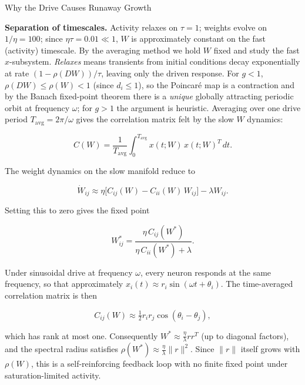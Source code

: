 \documentclass[
11pt,notheorems,hyperref={pdfauthor=whatever}
]{beamer}
\begin{document}
\begin{frame}{Why the Drive Causes Runaway Growth}
\small

\textbf{Separation of timescales.} Activity relaxes on $\tau=1$; weights evolve
on $1/\eta=100$; since $\eta\tau=0.01\ll 1$, $W$ is approximately constant on
the fast (activity) timescale. By the averaging method we hold $W$ fixed and
study the fast $x$-subsystem. \emph{Relaxes} means transients from initial
conditions decay exponentially at rate $(1-\rho(DW))/\tau$, leaving only the
driven response. For $g<1$, $\rho(DW)\leq\rho(W)<1$ (since $d_i\leq 1$), so
the Poincar\'{e} map is a contraction and by the Banach fixed-point theorem
there is a \emph{unique} globally attracting periodic orbit at frequency
$\omega$; for $g>1$ the argument is heuristic. Averaging over one drive period
$T_{\mathrm{avg}}=2\pi/\omega$ gives the correlation matrix felt by the slow
$W$ dynamics:

\[
C(W) = \frac{1}{T_{\mathrm{avg}}}\int_0^{T_{\mathrm{avg}}} x(t;W)\,x(t;W)^T \, dt.
\]

The weight dynamics on the slow manifold reduce to

\[
\dot{W}_{ij} \approx
\eta\bigl[C_{ij}(W) - C_{ii}(W)\, W_{ij}\bigr] - \lambda W_{ij}.
\]

Setting this to zero gives the fixed point

\[
W_{ij}^\ast = \frac{\eta\, C_{ij}(W^\ast)}{\eta\, C_{ii}(W^\ast) + \lambda}.
\]

\vspace{0.3em}

Under sinusoidal drive at frequency $\omega$, every neuron responds at the same frequency,
so that approximately $x_i(t) \approx r_i \sin(\omega t + \theta_i)$.
The time-averaged correlation matrix is then

\[
C_{ij}(W) \approx \tfrac{1}{2} r_i r_j \cos(\theta_i - \theta_j),
\]

which has rank at most one. Consequently $W^\ast \approx \frac{\eta}{\lambda} r r^T$
(up to diagonal factors), and the spectral radius satisfies
$\rho(W^\ast) \approx \frac{\eta}{\lambda}\|r\|^2$. Since $\|r\|$ itself grows with
$\rho(W)$, this is a self-reinforcing feedback loop with no finite
fixed point under saturation-limited activity.

\end{frame}
\end{document}

